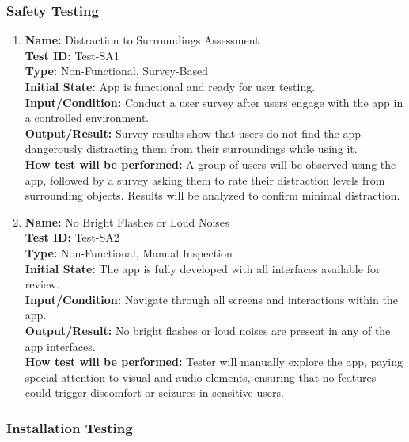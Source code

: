 \documentclass[12pt, titlepage]{article}
\begin{document}
\subsubsection{Safety Testing}

\begin{enumerate}

  \item \textbf{Name:} Distraction to Surroundings Assessment \label{itm:Test-SA1} \\
        \textbf{Test ID:} Test-SA1 \\
        \textbf{Type:} Non-Functional, Survey-Based \\
        \textbf{Initial State:} App is functional and ready for user testing. \\
        \textbf{Input/Condition:} Conduct a user survey after users engage with the app in a controlled environment. \\
        \textbf{Output/Result:} Survey results show that users do not find the app dangerously distracting them from their surroundings while using it. \\
        \textbf{How test will be performed:} A group of users will be observed using the app, followed by a survey asking them to rate their distraction levels from surrounding objects. Results will be analyzed to confirm minimal distraction.

  \item \textbf{Name:} No Bright Flashes or Loud Noises \label{itm:Test-SA2} \\
        \textbf{Test ID:} Test-SA2 \\
        \textbf{Type:} Non-Functional, Manual Inspection \\
        \textbf{Initial State:} The app is fully developed with all interfaces available for review. \\
        \textbf{Input/Condition:} Navigate through all screens and interactions within the app. \\
        \textbf{Output/Result:} No bright flashes or loud noises are present in any of the app interfaces. \\
        \textbf{How test will be performed:} Tester will manually explore the app, paying special attention to visual and audio elements, ensuring that no features could trigger discomfort or seizures in sensitive users.
\end{enumerate}

\subsubsection{Installation Testing}
\end{document}
